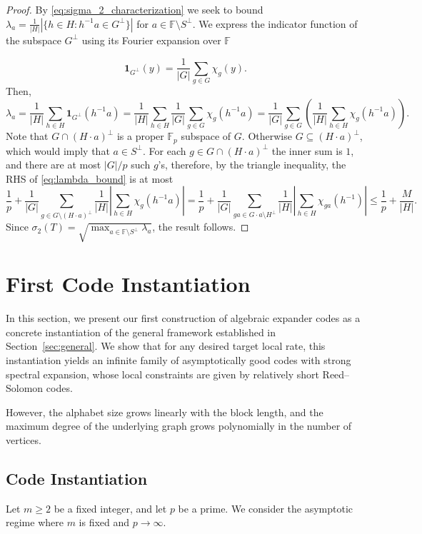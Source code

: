 \documentclass[11pt]{article}
\theoremstyle{plain}
\theoremstyle{definition}
\newcommand{\abs}[1]{\left|#1\right|}
\begin{document}
\begin{proof}
   By \eqref{eq:sigma_2_characterization} we seek to bound $\lambda_a = \frac{1}{|H|} |\{ h \in H : h^{-1}a \in G^\perp \}|$ for $a \in \mathbb{F}\setminus S^\perp$.
    We express the indicator function of the subspace $G^\perp$ using its Fourier expansion over $\mathbb{F}$ 
    
    \[
        \mathbf{1}_{G^\perp}(y) = \frac{1}{|G|} \sum_{g \in G} \chi_g(y).
    \]   
    Then,
    \begin{equation}
        \label{eq:lambda_bound}
        \lambda_a = \frac{1}{|H|} \sum_{h \in H} \mathbf{1}_{G^\perp}(h^{-1}a) = \frac{1}{|H|} \sum_{h \in H} \frac{1}{|G|} \sum_{g \in G} \chi_g(h^{-1}a) = \frac{1}{|G|} \sum_{g \in G} \left( \frac{1}{|H|} \sum_{h \in H} \chi_g(h^{-1}a) \right).
    \end{equation}
    Note that $G\cap (H\cdot a)^\perp$ is a proper $\mathbb{F}_p$ subspace of $G$. Otherwise $G\subseteq (H\cdot a )^\perp$, which would imply that $a\in S^\perp$. 
    For each $g\in G\cap (H\cdot a)^\perp$ the inner sum is $1$, and there are at most $\abs{G}/p$ such $g$'s, therefore, by the triangle inequality, the RHS of \eqref{eq:lambda_bound} is at most 
    $$\frac{1}{p}+\frac{1}{\abs{G}}\sum_{g\in G\setminus (H\cdot a)^\perp} \frac{1}{|H|} \abs{\sum_{h \in H} \chi_g(h^{-1}a)}= 
    \frac{1}{p}+\frac{1}{\abs{G}}\sum_{ga\in G\cdot a\setminus H^\perp} \frac{1}{|H|} \abs{\sum_{h \in H} \chi_{ga}(h^{-1})}
    \leq \frac{1}{p}+\frac{M}{|H|}.$$
    Since $\sigma_2(T) = \sqrt{\max_{a\in \mathbb{F}\setminus S^\perp  }\lambda_a}$, the result follows.
\end{proof}


\section{First Code Instantiation}
\label{sec:main-construction}
In this section, we present our first construction of algebraic expander codes as a concrete instantiation of the general framework established in Section~\ref{sec:general}. We show that for any desired target local rate, this instantiation yields an infinite family of asymptotically good codes with strong spectral expansion, whose local constraints are given by relatively short Reed--Solomon codes. 

However, the alphabet size grows linearly with the block length, and the maximum degree of the underlying graph grows polynomially in the number of vertices.


\subsection{Code Instantiation}
\label{sec:first-code}
Let $m \ge 2$ be a fixed integer, and let $p$ be a prime. We consider the asymptotic regime where $m$ is fixed and $p \to \infty$. 
\end{document}
